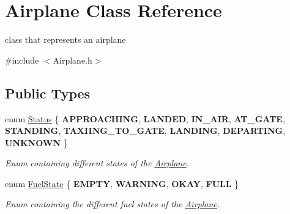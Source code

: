 \hypertarget{class_airplane}{}\section{Airplane Class Reference}
\label{class_airplane}


class that represents an airplane  




{\ttfamily \#include $<$Airplane.\+h$>$}

\subsection*{Public Types}
\begin{DoxyCompactItemize}
\item 
\mbox{\label{class_airplane_a2fe18f372ef9acb9d557998a560ad66e}} 
enum \mbox{\hyperlink{class_airplane_a2fe18f372ef9acb9d557998a560ad66e}{Status}} \{ \newline
{\bfseries A\+P\+P\+R\+O\+A\+C\+H\+I\+NG}, 
{\bfseries L\+A\+N\+D\+ED}, 
{\bfseries I\+N\+\_\+\+A\+IR}, 
{\bfseries A\+T\+\_\+\+G\+A\+TE}, 
\newline
{\bfseries S\+T\+A\+N\+D\+I\+NG}, 
{\bfseries T\+A\+X\+I\+I\+N\+G\+\_\+\+T\+O\+\_\+\+G\+A\+TE}, 
{\bfseries L\+A\+N\+D\+I\+NG}, 
{\bfseries D\+E\+P\+A\+R\+T\+I\+NG}, 
\newline
{\bfseries U\+N\+K\+N\+O\+WN}
 \}
\begin{DoxyCompactList}\small\item\em Enum containing different states of the \mbox{\hyperlink{class_airplane}{Airplane}}. \end{DoxyCompactList}\item 
\mbox{\label{class_airplane_ad17ce69f4dd39704789158c726f5bf45}} 
enum \mbox{\hyperlink{class_airplane_ad17ce69f4dd39704789158c726f5bf45}{Fuel\+State}} \{ {\bfseries E\+M\+P\+TY}, 
{\bfseries W\+A\+R\+N\+I\+NG}, 
{\bfseries O\+K\+AY}, 
{\bfseries F\+U\+LL}
 \}
\begin{DoxyCompactList}\small\item\em Enum containing the different fuel states of the \mbox{\hyperlink{class_airplane}{Airplane}}. \end{DoxyCompactList}\end{DoxyCompactItemize}
